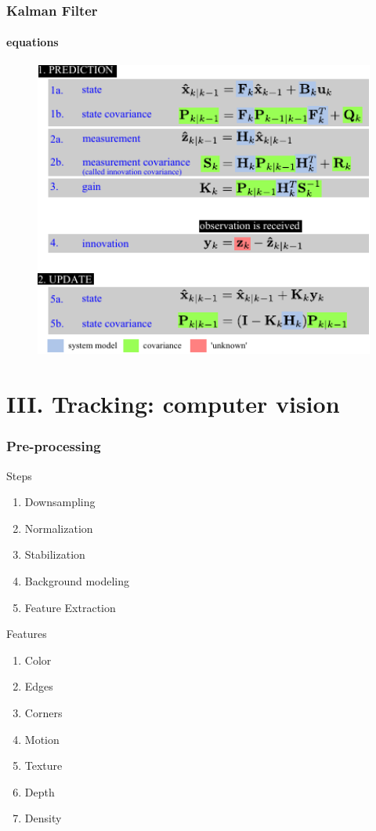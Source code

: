 \begin{frame}
\frametitle{Kalman Filter}
\framesubtitle{equations}
\logoCSIPCPL\mypagenum
	\begin{figure}
		\includegraphics[width=1.0\textwidth]{thesis/TRK_KalmanFilter_equations.pdf}
	\end{figure}
\end{frame}




\section{III. Tracking: computer vision}


\begin{frame}
\frametitle{Pre-processing}
\logoCSIPCPL\mypagenum
	{\color{red}Steps}
	\begin{enumerate}
		\item Downsampling
		\item Normalization
		\item Stabilization
		\item Background modeling
		\item Feature Extraction
	\end{enumerate}
	\vspace{0.3in}
	{\color{red}Features}
	\begin{enumerate}
		\item Color
		\item Edges
		\item Corners
		\item Motion
		\item Texture
		\item Depth
		\item Density
	\end{enumerate}
\end{frame}


